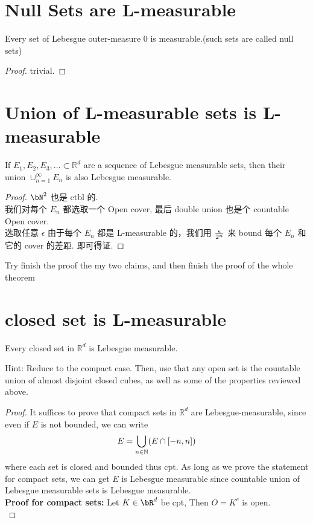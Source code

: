 \documentclass[lang=cn,11pt]{template}
\begin{document}
\section{Null Sets are L-measurable}
\begin{theorem}
Every set of Lebesgue outer-measure 0 is measurable.(such sets are called null sets)
\end{theorem}
\begin{proof}
    trivial.
\end{proof}

\section{Union of L-measurable sets is L-measurable} 
\begin{theorem}
If \( E_1, E_2, E_3, \ldots \subset \mathbb{R}^d \) are a sequence of Lebesgue measurable sets, then their union \( \cup_{n=1}^{\infty} E_n \) is also Lebesgue measurable.
\end{theorem}
\begin{proof}
    $\bN^2$ 也是 ctbl 的.\\
    我们对每个 $E_n$ 都选取一个 Open cover, 最后 double union 也是个 countable Open cover.\\
    选取任意 $\epsilon$
    由于每个 $E_n$ 都是 L-measurable 的，我们用 $\epsilon \over {2^n}$ 来 bound 每个 $E_n$ 和它的 cover 的差距. 即可得证.
\end{proof}



Try finish the proof the my two claims, and then finish the proof of the whole theorem
\section{closed set is L-measurable}
\begin{theorem}
Every closed set in \( \mathbb{R}^d \) is Lebesgue measurable.
\end{theorem}
Hint: Reduce to the compact case. Then, use that any open set is the countable union of almost disjoint closed cubes, as well as some of the properties reviewed above.
\begin{proof}
It suffices to prove that compact sets in $\mathbb{R}^d$ are Lebesgue-measurable, since even if $E$ is not bounded, we can write    $$E =  \displaystyle\bigcup_{n \in \mathbb{N}} (E \cap [-n, n]) $$
where each set is closed and bounded thus cpt. As long as we prove the statement for compact sets, we can get $E$ is Lebesgue measurable since countable union of Lebesgue measurable sets is Lebesgue measurable.\\
\textbf{Proof for compact sets:} Let $K \in \bR ^d $ be cpt, Then $O = K^c$ is open.\\

\end{proof}
\end{document}
